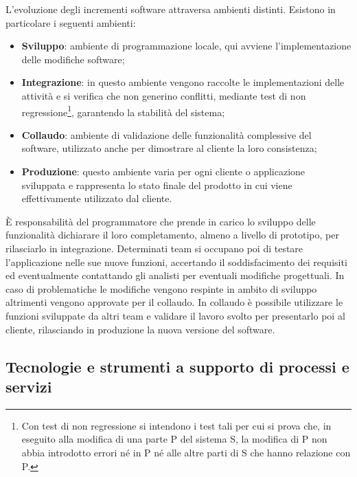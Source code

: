 	L'evoluzione degli incrementi software attraversa ambienti distinti. Esistono in particolare i seguenti ambienti:
	\begin{itemize}
		\item \textbf{Sviluppo}: ambiente di programmazione locale, qui avviene l'implementazione delle modifiche software;
		\item \textbf{Integrazione}: in questo ambiente vengono raccolte le implementazioni delle attività e si verifica che non generino conflitti, mediante test di non regressione\footnote{Con test di non regressione si intendono i test tali per cui si prova che, in eseguito alla modifica di una parte P del sistema S, la modifica di P non abbia introdotto errori né in P né alle altre parti di S che hanno relazione con P.}, garantendo la stabilità del sistema;
		\item \textbf{Collaudo}: ambiente di validazione delle funzionalità complessive del software, utilizzato anche per dimostrare al cliente la loro consistenza;
		\item \textbf{Produzione}: questo ambiente varia per ogni cliente o applicazione sviluppata e rappresenta lo stato finale del prodotto in cui viene effettivamente utilizzato dal cliente.
	\end{itemize}	
	
	È responsabilità del programmatore che prende in carico lo sviluppo delle funzionalità dichiarare il loro completamento, almeno a livello di prototipo, per rilasciarlo in integrazione. Determinati team si occupano poi di testare l'applicazione nelle sue nuove funzioni, accertando il soddisfacimento dei requisiti ed eventualmente contattando gli analisti per eventuali modifiche progettuali. In caso di problematiche le modifiche vengono respinte in ambito di sviluppo altrimenti vengono approvate per il collaudo. In collaudo è possibile utilizzare le funzioni sviluppate da altri team e validare il lavoro svolto per presentarlo poi al cliente, rilasciando in produzione la nuova versione del software.
	
	\subsection{Tecnologie e strumenti a supporto di processi e servizi}

